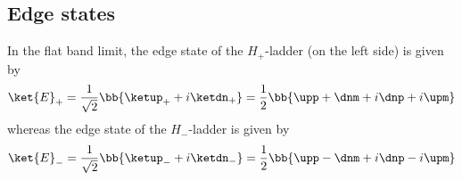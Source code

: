 



\subsection{Edge states}
In the flat band limit, the edge state of the $H_+$-ladder (on the left side) is given by
\begin{align}
    \ket{E}_+ = \frac{1}{\sqrt{2}} \bb{ \ketup_+ + i \ketdn_+ } = \frac{1}{2} \bb{ \upp + \dnm + i\dnp + i\upm }
\end{align}
whereas the edge state of the $H_-$-ladder is given by
\begin{align}
    \ket{E}_- = \frac{1}{\sqrt{2}} \bb{ \ketup_- + i \ketdn_- } = \frac{1}{2} \bb{ \upp - \dnm + i\dnp - i\upm }
\end{align}


